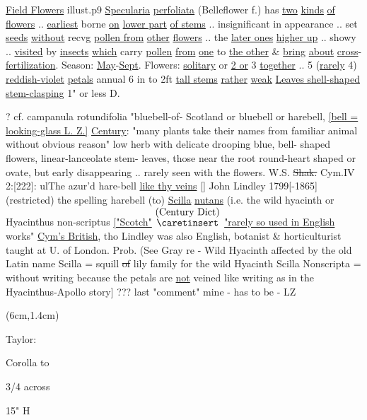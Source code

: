 \documentclass[a4paper]{article}
\begin{document}
\begin{minipage}[t]{0.5\textwidth}
\vspace{10cm}
\ul{Field Flowers}
illust.p9 \ul{Specularia}
\ul{perfoliata} (Belleflower
f.)
\setul{}{2pt}
has \ul{two} \ul{kinds} \ul{of flowers} .. \ul{earliest}
borne \ul{on} \ul{lower part} \ul{of stems} .. insignificant
in appearance .. set \ul{seeds} \ul{without} recvg
\ul{pollen from} \ul{other} \ul{flowers} .. the \ul{later ones}
\ul{higher up} .. showy .. \ul{visited} by \ul{insects}
\ul{which} carry \ul{pollen} \ul{from} \ul{one} to \ul{the other} \& \ul{bring}
\ul{about} \ul{cross}-\ul{fertilization}. Season:
\ul{May}-\ul{Sept}. Flowers: \ul{solitary} or \ul{2 or} 3
\ul{together} .. 5 (\ul{rarely} 4) \ul{reddish-violet} \ul{petals}
annual 6 in to 2ft \ul{tall stems} \ul{rather}
\ul{weak} \ul{Leaves shell-shaped} \ul{stem}\ul{-clasping}
1" or less D.\par 
\color{red}
? cf. campanula rotundifolia "bluebell-of-
Scotland or bluebell or harebell,
\ul{[bell = looking-glass L. Z.]} 
\setul{}{1pt}
\ul{Century}:
"many plants take their names from
familiar animal %
without obvious reason"
low herb with delicate drooping blue, bell-
shaped flowers, linear-lanceolate stem-
leaves, those near the root round-heart
shaped or ovate, but early disappearing
.. rarely seen with the flowers.
W.S. \sout{Shak.} Cym.IV 2:[222]: ul{The azur'd hare-bell}
\ul{like thy veins} [] John Lindley 1799[-1865]
(restricted) the spelling harebell
(to) \ul{Scilla} \ul{nutans} (i.e. the wild
hyacinth or Hyacinthus non-scriptus
\ul{
    ["Scotch"} 
\color{blue}
$\stackrel{\hbox{(Century Dict)}}{\hbox{$\caretinsert$}}$
\color{red}
\ul{"rarely so used in English}
works" \ul{Cym's British}, tho Lindley 
was also English, botanist \& horticulturist
taught at U. of London. Prob. (See
Gray re - Wild Hyacinth affected
by the old Latin name Scilla = squill
\sout{of} lily family for the wild Hyacinth
Scilla Nonscripta = without writing
because the petals are \ul{not} veined like
writing as in the Hyacinthus-Apollo story]
\color{blue}
??? last "comment" mine
- has to be - LZ
\end{minipage}


\begin{textblock*}{2cm}(6cm,1.4cm)%
	\begin{minipage}{2cm} 
        \color{blue}
        Taylor:\par
        \vspace{5pt}
        \small
            Corolla to\par
            3/4 across\par
            15" H\par
        \normalfont			
	\end{minipage}%
\end{textblock*}%
\end{document}
